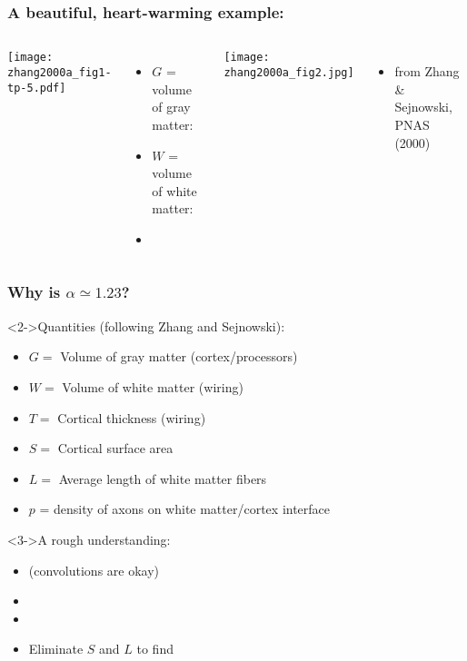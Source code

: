 \begin{frame}[plain]
  \frametitle{A beautiful, heart-warming example:}

  \begin{block}{}
    \begin{columns}
      \texttt{[image: zhang2000a\_fig1-tp-5.pdf]} 
      \begin{itemize}
      \item 
        $G$ = volume of gray matter:\\ 
      \item 
        $W$ = volume of white matter:\\ 
      \item 
      \end{itemize}
      \texttt{[image: zhang2000a\_fig2.jpg]}  
      \begin{itemize}
      \item 
        \small from Zhang \& Sejnowski, PNAS (2000)\cite{zhang2000a}
      \end{itemize}
    \end{columns}
    

  \end{block}

\end{frame}

\begin{frame}
  \frametitle{Why is $\alpha \simeq 1.23$?}

  \begin{block}<2->{Quantities (following Zhang and Sejnowski):}
    \begin{itemize}
    \item $G = $ Volume of gray matter (cortex/processors)
    \item $W = $ Volume of white matter (wiring)
    \item $T = $ Cortical thickness (wiring)
    \item $S = $ Cortical surface area
    \item $L = $ Average length of white matter fibers
    \item $p$ = density of axons on white matter/cortex interface
    \end{itemize}
  \end{block}

  \begin{block}<3->{A rough understanding:}
    \begin{itemize}
    \item<4->  (convolutions are okay)
    \item<5-> 
    \item<6->  
    \item<7-> Eliminate $S$ and $L$ to find 
    \end{itemize}
  \end{block}
  

\end{frame}

